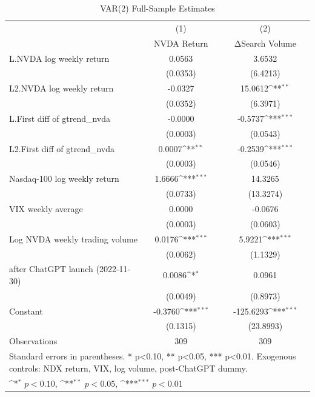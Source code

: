 \begin{table}[htbp]\centering
\def\sym#1{\ifmmode^{#1}\else\(^{#1}\)\fi}
\caption{VAR(2) Full-Sample Estimates}
\begin{tabular}{l*{2}{c}}
\toprule
                    &\multicolumn{1}{c}{(1)}&\multicolumn{1}{c}{(2)}\\
                    &\multicolumn{1}{c}{NVDA Return}&\multicolumn{1}{c}{ΔSearch Volume}\\
\midrule
L.NVDA log weekly return&      0.0563         &      3.6532         \\
                    &    (0.0353)         &    (6.4213)         \\
\addlinespace
L2.NVDA log weekly return&     -0.0327         &     15.0612\sym{**} \\
                    &    (0.0352)         &    (6.3971)         \\
\addlinespace
L.First diff of gtrend\_nvda&     -0.0000         &     -0.5737\sym{***}\\
                    &    (0.0003)         &    (0.0543)         \\
\addlinespace
L2.First diff of gtrend\_nvda&      0.0007\sym{**} &     -0.2539\sym{***}\\
                    &    (0.0003)         &    (0.0546)         \\
\addlinespace
Nasdaq-100 log weekly return&      1.6666\sym{***}&     14.3265         \\
                    &    (0.0733)         &   (13.3274)         \\
\addlinespace
VIX weekly average  &      0.0000         &     -0.0676         \\
                    &    (0.0003)         &    (0.0603)         \\
\addlinespace
Log NVDA weekly trading volume&      0.0176\sym{***}&      5.9221\sym{***}\\
                    &    (0.0062)         &    (1.1329)         \\
\addlinespace
=1 after ChatGPT launch (2022-11-30)&      0.0086\sym{*}  &      0.0961         \\
                    &    (0.0049)         &    (0.8973)         \\
\addlinespace
Constant            &     -0.3760\sym{***}&   -125.6293\sym{***}\\
                    &    (0.1315)         &   (23.8993)         \\
\midrule
Observations        &         309         &         309         \\
\bottomrule
\multicolumn{3}{l}{\footnotesize Standard errors in parentheses. * p<0.10, ** p<0.05, *** p<0.01. Exogenous controls: NDX return, VIX, log volume, post-ChatGPT dummy.}\\
\multicolumn{3}{l}{\footnotesize \sym{*} \(p<0.10\), \sym{**} \(p<0.05\), \sym{***} \(p<0.01\)}\\
\end{tabular}
\end{table}
